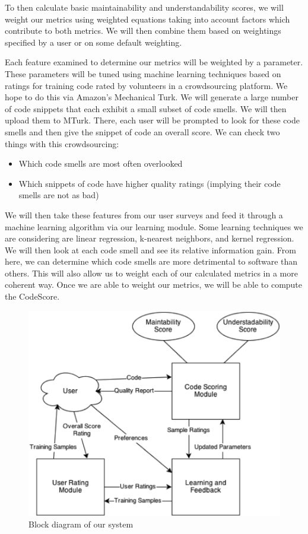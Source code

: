 \documentclass{sig-alternate}
\begin{document}
To then calculate basic maintainability and understandability scores, we will weight our metrics using weighted equations taking into account factors which contribute to both metrics. We will then combine them based on weightings specified by a user or on some default weighting.

Each feature examined to determine our metrics will be weighted by a parameter. These parameters will be tuned using machine learning techniques based on ratings for training code rated by volunteers in a crowdsourcing platform. We hope to do this via Amazon's Mechanical Turk. We will generate a large number of code snippets that each exhibit a small subset of code smells. We will then upload them to MTurk. There, each user will be prompted to look for these code smells and then give the snippet of code an overall score. We can check two things with this crowdsourcing:

\begin{itemize}
\item Which code smells are most often overlooked
\item Which snippets of code have higher quality ratings (implying their code smells are not as bad)
\end{itemize}

We will then take these features from our user surveys and feed it through a machine learning algorithm via our learning module. Some learning techniques we are considering are linear regression, k-nearest neighbors, and kernel regression. We will then look at each code smell and see its relative information gain. From here, we can determine which code smells are more detrimental to software than others. This will also allow us to weight each of our calculated metrics in a more coherent way. Once we are able to weight our metrics, we will be able to compute the CodeScore.

\begin{figure}[htb!]
	\begin{center}
		\includegraphics[width=0.9\linewidth]{block_diagram}
	\end{center}
	\vspace{-12pt}
	\caption{Block diagram of our system}
	\label{fig:some_graph}
\end{figure}
\end{document}
